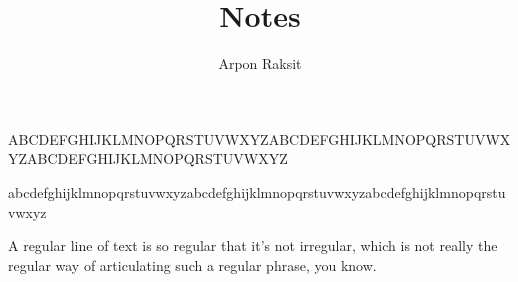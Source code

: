 



\title{Notes}
\author{Arpon Raksit}
\date{}


\maketitle
\thispagestyle{fancy}


\noindent ABCDEFGHIJKLMNOPQRSTUVWXYZABCDEFGHIJKLMNOPQRSTUVWXYZABCDEFGHIJKLMNOPQRSTUVWXYZ

\noindent abcdefghijklmnopqrstuvwxyzabcdefghijklmnopqrstuvwxyzabcdefghijklmnopqrstuvwxyz

A regular line of text is so regular that it's not irregular, which is not really the regular way of articulating such a regular phrase, you know.





% 
% 


